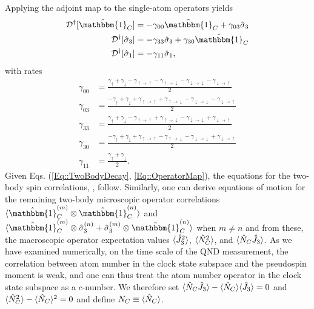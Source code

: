 \documentclass[preprint, aps,pra,onecolumn]{revtex4-1} %
\newcommand{\gammauu}{\gamma_{\uparrow \rightarrow \uparrow}}
\newcommand{\gammadd}{\gamma_{\downarrow \rightarrow \downarrow}}
\newcommand{\gammaud}{\gamma_{\uparrow \rightarrow \downarrow}}
\newcommand{\gammadu}{\gamma_{\downarrow \rightarrow \uparrow}}
\begin{document}
\begin{appendix}
Applying the adjoint map to the single-atom operators yields 
	\begin{subequations} \label{Eq::OperatorMap}
	\begin{align}
		\mathcal{D}\dg[\hat{\mathbbm{1}}_C] & = - \gamma_{00} \hat{\mathbbm{1}}_C +\gamma_{03} \hat{\sigma}_3 \label {Eq::Idecay} \\
		\mathcal{D}\dg[\hat{\sigma}_3] & =- \gamma_{33} \hat{\sigma}_3 +  \gamma_{30} \hat{\mathbbm{1}}_C 
\label{Eq::zdecay} \\
		\mathcal{D}\dg[\hat{\sigma}_1] & = - \gamma_{11} \hat{\sigma}_1\label{Eq::xdecay},
	\end{align}
	\end{subequations}
with rates	
	\begin{subequations} \label{Eq::DecayRates}
	\begin{align}
		\gamma_{00} 
			& = \frac{\gamma_{\uparrow}+\gamma_{\downarrow} - \gammauu-\gammaud  -\gammadd-\gammadu}{2} \label{Eq::lrate} \\
			\gamma_{03} 
			& = \frac{-\gamma_{\uparrow}+\gamma_{\downarrow} +\gammauu + \gammaud - \gammadd - \gammadu }{2}\\		
		\gamma_{33} 
			& = \frac{\gamma_{\uparrow}+\gamma_{\downarrow} - \gammauu+\gammaud  -\gammadd+\gammadu}{2}\\
			\gamma_{30} 
			& = \frac{-\gamma_{\uparrow} + \gamma_{\downarrow} + \gammauu - \gammaud - \gammadd + \gammadu }{2} \\
			\gamma_{11} 
			& = \frac{\gamma_{\uparrow}+\gamma_{\downarrow}}{2}. \label{Eq::frate}
	\end{align}
	\end{subequations}
Given Eqs. (\ref{Eq::TwoBodyDecay}, \ref{Eq::OperatorMap}), the equations for the two-body spin correlations, , follow.  Similarly, one can derive equations of motion for the remaining two-body microscopic operator correlations $ \expt{\hat{\mathbbm{1}}^{(m)}_C \otimes \hat{\mathbbm{1}}^{(n)}_C} $ and $ \expt{\hat{\mathbbm{1}}^{(m)}_C \otimes \hat{\sigma}_3^{(n)} + \hat{\sigma}_3^{(m)} \otimes \hat{\mathbbm{1}}^{(n)}_C } $ when $ m\neq n $ and from these, the macroscopic operator expectation values $ \langle{\hat{J}_3^2}\rangle $, $ \langle{\hat{N}_C^2}\rangle $, and $ \langle{\hat{N}_C\hat{J}_3}\rangle $.  As we have examined numerically, on the time scale of the QND measurement, the correlation between atom number in the clock state subspace and the pseudospin moment is weak, and one can thus treat the atom number operator in the clock state subspace as a $c$-number.
We therefore set $ \langle{\hat{N}_C\hat{J}_3}\rangle-\langle{\hat{N}_C}\rangle\langle{\hat{J}_3}\rangle = 0 $ and $ \langle{\hat{N}_C^2}\rangle - \langle{\hat{N}_C}\rangle^2 = 0 $ and define $ N_C\equiv \langle{\hat{N}_C}\rangle$. 


\end{appendix}
\end{document}
